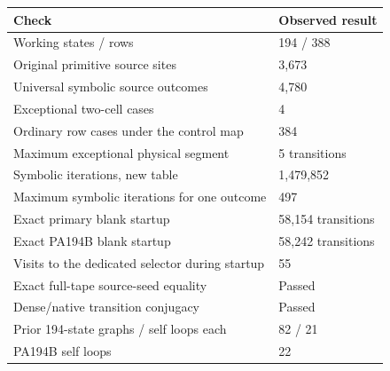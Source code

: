 \begin{center}\small
\begin{tabular}{@{}ll@{}}
\toprule Check & Observed result\\\midrule
Working states / rows & 194 / 388\\
Original primitive source sites & 3,673\\
Universal symbolic source outcomes & 4,780\\
Exceptional two-cell cases & 4\\
Ordinary row cases under the control map & 384\\
Maximum exceptional physical segment & 5 transitions\\
Symbolic iterations, new table & 1,479,852\\
Maximum symbolic iterations for one outcome & 497\\
Exact primary blank startup & 58,154 transitions\\
Exact PA194B blank startup & 58,242 transitions\\
Visits to the dedicated selector during startup & 55\\
Exact full-tape source-seed equality & Passed\\
Dense/native transition conjugacy & Passed\\
Prior 194-state graphs / self loops each & 82 / 21\\
PA194B self loops & 22\\
\bottomrule\end{tabular}\end{center}
